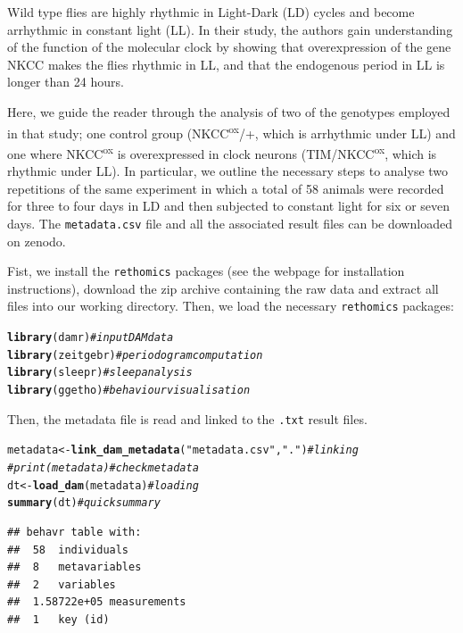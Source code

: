 \documentclass[10pt,letterpaper]{article}\usepackage[]{graphicx}\usepackage[]{color}
\makeatletter
\newcommand{\hlstr}[1]{\textcolor[rgb]{0.192,0.494,0.8}{#1}}%
\newcommand{\hlcom}[1]{\textcolor[rgb]{0.678,0.584,0.686}{\textit{#1}}}%
\newcommand{\hlstd}[1]{\textcolor[rgb]{0.345,0.345,0.345}{#1}}%
\newcommand{\hlkwb}[1]{\textcolor[rgb]{0.69,0.353,0.396}{#1}}%
\newcommand{\hlkwd}[1]{\textcolor[rgb]{0.737,0.353,0.396}{\textbf{#1}}}%
\newenvironment{kframe}{%
 \def\at@end@of@kframe{}%
 \ifinner\ifhmode%
  \def\at@end@of@kframe{\end{minipage}}%
  \begin{minipage}{\columnwidth}%
 \fi\fi%
 \def\FrameCommand##1{\hskip\@totalleftmargin \hskip-\fboxsep
 \colorbox{shadecolor}{##1}\hskip-\fboxsep
     \hskip-\linewidth \hskip-\@totalleftmargin \hskip\columnwidth}%
 \MakeFramed {\advance\hsize-\width
   \@totalleftmargin\z@ \linewidth\hsize
   \@setminipage}}%
 {\par\unskip\endMakeFramed%
 \at@end@of@kframe}
\newenvironment{knitrout}{}{} %
\makeatother
\begin{document}
Wild type flies are highly rhythmic in Light-Dark (LD) cycles and become arrhythmic in constant light (LL).
In their study, the authors gain understanding of the function of the molecular clock by showing that overexpression of the gene NKCC makes the flies rhythmic in LL,
and that the endogenous period in LL is longer than 24 hours.

Here, we guide the reader through the analysis of two of the genotypes employed in that study;
one control group (NKCC\textsuperscript{ox}/+, which is arrhythmic under LL) and one where NKCC\textsuperscript{ox} is overexpressed in clock neurons (TIM/NKCC\textsuperscript{ox}, which is rhythmic under LL).
In particular, we outline the necessary steps to analyse two repetitions of the same experiment in which a total of 58 animals were recorded for three to four days in LD and then subjected to constant light for six or seven days.
The \texttt{metadata.csv} file and all the associated result files can be downloaded on zenodo\cite{ogueta_ll_2018}.

Fist, we install the \texttt{rethomics} packages (see the webpage for installation instructions), download the zip archive containing the raw data and extract all files into our working directory.
Then, we load the necessary \texttt{rethomics} packages:

\begin{knitrout}
\color{fgcolor}\begin{kframe}
\begin{alltt}
\hlkwd{library}\hlstd{(damr)}      \hlcom{# input DAM data}
\hlkwd{library}\hlstd{(zeitgebr)}  \hlcom{# periodogram computation}
\hlkwd{library}\hlstd{(sleepr)}    \hlcom{# sleep analysis}
\hlkwd{library}\hlstd{(ggetho)}    \hlcom{# behaviour visualisation}
\end{alltt}
\end{kframe}
\end{knitrout}

Then, the metadata file is read and linked to the \texttt{.txt} result files.

\begin{knitrout}
\color{fgcolor}\begin{kframe}
\begin{alltt}
\hlstd{metadata} \hlkwb{<-} \hlkwd{link_dam_metadata}\hlstd{(}\hlstr{"metadata.csv"}\hlstd{,} \hlstr{"."}\hlstd{)}   \hlcom{# linking}
\hlcom{# print(metadata)                                    # check metadata}
\hlstd{dt} \hlkwb{<-} \hlkwd{load_dam}\hlstd{(metadata)}                             \hlcom{# loading}
\hlkwd{summary}\hlstd{(dt)}                                          \hlcom{# quick summary}
\end{alltt}
\begin{verbatim}
## behavr table with:
##  58	individuals
##  8	metavariables
##  2	variables
##  1.58722e+05	measurements
##  1	key (id)
\end{verbatim}
\end{kframe}
\end{knitrout}
\end{document}
